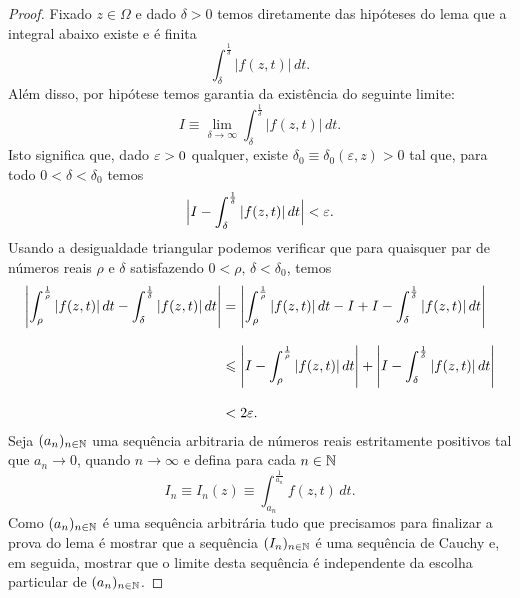     \begin{proof}
        Fixado $z\in \Omega$ e dado $\delta>0$ temos diretamente
        das hipóteses do lema que a integral abaixo existe e é finita
        \[
        \int_{\delta}^{ \frac{1}{\delta}  }|f(z,t)| \, dt.
        \]
        Além disso, por hipótese temos garantia da existência do seguinte
        limite:
        \[
        I \equiv \lim_{\delta \to \infty} 
        \int_{\delta}^{ \frac{1}{\delta} }|f(z,t)| \, dt.
        \]
        Isto significa que, dado $\varepsilon > 0$ qualquer, existe 
        $\delta_0\equiv \delta_0(\varepsilon,z) > 0$ tal que, para todo
        $0<\delta < \delta_0$  temos
        \[
        \Big | I - \int_{\delta}^{ \frac{1}{\delta} }|f(z,t)| \, dt \Big | < \varepsilon.
        \]
        Usando a desigualdade triangular 
        podemos verificar que para quaisquer par de
        números reais $\rho$ e $\delta$ satisfazendo
        $0<\rho,\, \delta <\delta_0$, temos
        \begin{align}
        \label{eq-aux1-lema-conv-abs-cond-int-imp}
        \left| 
            \int_{\rho}^{ \frac{1}{\rho} }|f(z,t)| \, dt
            -
            \int_{\delta}^{ \frac{1}{\delta} }|f(z,t)| \, dt
        \right| 
        &= 
        \left| 
            \int_{\rho}^{ \frac{1}{\rho} }|f(z,t)| \, dt - I
            +
            I -\int_{\delta}^{ \frac{1}{\delta} }|f(z,t)| \, dt
        \right|
        \nonumber\\[0.3cm]
        &\leqslant
        \left| 
            I- \int_{\rho}^{ \frac{1}{\rho} }|f(z,t)| \, dt 
        \right|
        +
        \left| 
            I -\int_{\delta}^{ \frac{1}{\delta} }|f(z,t)| \, dt
        \right|
        \nonumber\\[0.3cm]
        &<
        2\varepsilon.
        \end{align}
        Seja $(a_n)_{n\in\mathbb{N}}$ uma sequência arbitraria de números reais estritamente positivos tal que 
        $a_n\to 0$, quando $n\to\infty$ e defina para cada $n\in\mathbb{N}$
        \[
        I_n  
        \equiv 
        I_n(z) 
        \equiv
        \int_{ a_n }^{ \frac{1}{a_n} }f(z,t) \, dt.
        \]
        Como $(a_n)_{n\in \mathbb{N}}$ é uma sequência arbitrária
        tudo que precisamos para finalizar a prova do lema é mostrar que a sequência $(I_n)_{n\in\mathbb{N}}$ é uma sequência de Cauchy e, em seguida,
        mostrar que o limite desta sequência é independente da escolha
        particular de $(a_n)_{n\in \mathbb{N}}$. 
        

\end{proof}
